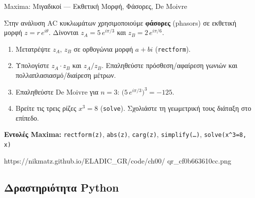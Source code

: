 %
%

\casactivbox%
  {Maxima: Μιγαδικοί — Εκθετική Μορφή, Φάσορες, De Moivre}%
  {%
    \label{cas:ch0_complex_exponential}
    Στην ανάλυση AC κυκλωμάτων χρησιμοποιούμε \textbf{φάσορες} (phasors)
    σε εκθετική μορφή $z = r\,e^{i\theta}$.
    Δίνονται $z_A = 5\,e^{i\pi/3}$ και $z_B = 2\,e^{i\pi/6}$.
    \begin{enumerate}[label=(\alph*),itemsep=2pt]
      \item Μετατρέψτε $z_A$, $z_B$ σε ορθογώνια μορφή $a+bi$
        (\texttt{rectform}).
      \item Υπολογίστε $z_A \cdot z_B$ και $z_A / z_B$. Επαληθεύστε
        πρόσθεση/αφαίρεση γωνιών και πολλαπλασιασμό/διαίρεση μέτρων.
      \item Επαληθεύστε De Moivre για $n=3$:
        $\bigl(5\,e^{i\pi/3}\bigr)^3 = -125$.
      \item Βρείτε τις τρεις ρίζες $x^3 = 8$ (\texttt{solve}).
        Σχολιάστε τη γεωμετρική τους διάταξη στο επίπεδο.
    \end{enumerate}
    \smallskip
    \textbf{Εντολές Maxima:}
    \texttt{rectform(z)}, \texttt{abs(z)}, \texttt{carg(z)},
    \texttt{simplify(\ldots)}, \texttt{solve(x\^{}3=8, x)}
  }%
  {https://nikmatz.github.io/ELADIC_GR/code/ch00/}%
  {qr_cf0b663610cc.png}

\subsection*{Δραστηριότητα Python}

